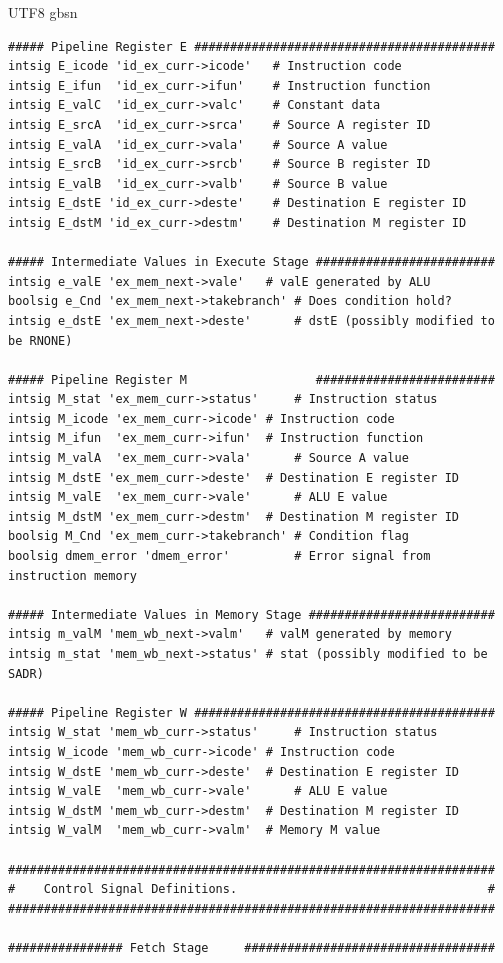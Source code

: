 \documentclass {article}
\begin{document}
\begin {CJK*} {UTF8} {gbsn}
\begin{lstlisting}
##### Pipeline Register E ##########################################
intsig E_icode 'id_ex_curr->icode'   # Instruction code
intsig E_ifun  'id_ex_curr->ifun'    # Instruction function
intsig E_valC  'id_ex_curr->valc'    # Constant data
intsig E_srcA  'id_ex_curr->srca'    # Source A register ID
intsig E_valA  'id_ex_curr->vala'    # Source A value
intsig E_srcB  'id_ex_curr->srcb'    # Source B register ID
intsig E_valB  'id_ex_curr->valb'    # Source B value
intsig E_dstE 'id_ex_curr->deste'    # Destination E register ID
intsig E_dstM 'id_ex_curr->destm'    # Destination M register ID

##### Intermediate Values in Execute Stage #########################
intsig e_valE 'ex_mem_next->vale'	# valE generated by ALU
boolsig e_Cnd 'ex_mem_next->takebranch' # Does condition hold?
intsig e_dstE 'ex_mem_next->deste'      # dstE (possibly modified to be RNONE)

##### Pipeline Register M                  #########################
intsig M_stat 'ex_mem_curr->status'     # Instruction status
intsig M_icode 'ex_mem_curr->icode'	# Instruction code
intsig M_ifun  'ex_mem_curr->ifun'	# Instruction function
intsig M_valA  'ex_mem_curr->vala'      # Source A value
intsig M_dstE 'ex_mem_curr->deste'	# Destination E register ID
intsig M_valE  'ex_mem_curr->vale'      # ALU E value
intsig M_dstM 'ex_mem_curr->destm'	# Destination M register ID
boolsig M_Cnd 'ex_mem_curr->takebranch'	# Condition flag
boolsig dmem_error 'dmem_error'	        # Error signal from instruction memory

##### Intermediate Values in Memory Stage ##########################
intsig m_valM 'mem_wb_next->valm'	# valM generated by memory
intsig m_stat 'mem_wb_next->status'	# stat (possibly modified to be SADR)

##### Pipeline Register W ##########################################
intsig W_stat 'mem_wb_curr->status'     # Instruction status
intsig W_icode 'mem_wb_curr->icode'	# Instruction code
intsig W_dstE 'mem_wb_curr->deste'	# Destination E register ID
intsig W_valE  'mem_wb_curr->vale'      # ALU E value
intsig W_dstM 'mem_wb_curr->destm'	# Destination M register ID
intsig W_valM  'mem_wb_curr->valm'	# Memory M value

####################################################################
#    Control Signal Definitions.                                   #
####################################################################

################ Fetch Stage     ###################################


\end{lstlisting}
\end{CJK*}
\end{document}

